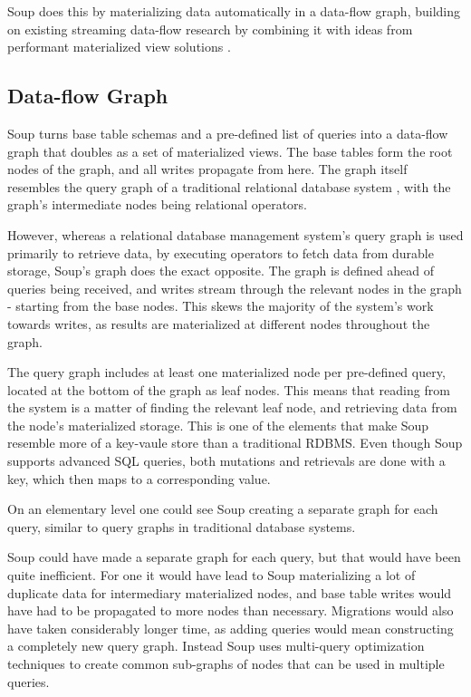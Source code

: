 \documentclass[b5paper,twoside]{report}
\begin{document}
Soup does this by materializing data automatically in a data-flow
graph, building on existing streaming data-flow research \cite{naiad, dataflow}
by combining it with ideas from performant materialized view solutions
\cite{dbtoaster, pequod}.

\subsection{Data-flow Graph}
Soup turns base table schemas and a pre-defined list of queries into a data-flow
graph that doubles as a set of materialized views. The base tables form the
root nodes of the graph, and all writes propagate from here. The graph itself
resembles the query graph of a traditional relational database system
\cite{codd}, with the graph's intermediate nodes being relational operators.

However, whereas a relational database management system's query graph is used
primarily to retrieve data, by executing operators to fetch data from durable
storage, Soup's graph does the exact opposite. The graph is defined ahead of
queries being received, and writes stream through the relevant nodes in the
graph - starting from the base nodes. This skews the majority of the system's
work towards writes, as results are materialized at different nodes throughout
the graph.

The query graph includes at least one materialized node per pre-defined query,
located at the bottom of the graph as leaf nodes. This means that reading from
the system is a matter of finding the relevant leaf node, and retrieving data
from the node's materialized storage. This is one of the elements that make Soup
resemble more of a key-vaule store than a traditional RDBMS. Even though Soup
supports advanced SQL queries, both mutations and retrievals are done with a
key, which then maps to a corresponding value.

On an elementary level one could see Soup creating a separate graph for
each query, similar to query graphs in traditional database systems.

Soup could have made a separate graph for each query, but that would have been
quite inefficient. For one it would have lead to Soup materializing a lot of
duplicate data for intermediary materialized nodes, and base table writes would
have had to be propagated to more nodes than necessary. Migrations would also
have taken considerably longer time, as adding queries would mean constructing a
completely new query graph. Instead Soup uses multi-query optimization
techniques to create common sub-graphs of nodes that can be used in multiple
queries.
\end{document}
